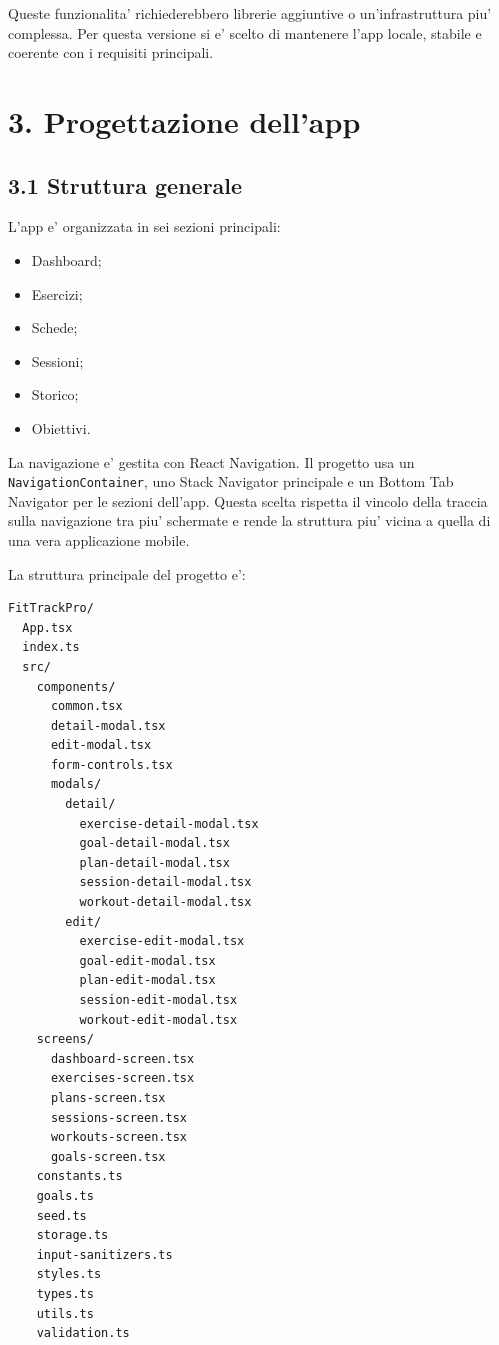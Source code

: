 \documentclass[11pt,a4paper]{article}
\begin{document}
Queste funzionalita' richiederebbero librerie aggiuntive o un'infrastruttura piu' complessa. Per questa versione si e' scelto di mantenere l'app locale, stabile e coerente con i requisiti principali.

\section{3. Progettazione dell'app}

\subsection{3.1 Struttura generale}

L'app e' organizzata in sei sezioni principali:

\begin{itemize}
  \item Dashboard;
  \item Esercizi;
  \item Schede;
  \item Sessioni;
  \item Storico;
  \item Obiettivi.
\end{itemize}

La navigazione e' gestita con React Navigation. Il progetto usa un \texttt{NavigationContainer}, uno Stack Navigator principale e un Bottom Tab Navigator per le sezioni dell'app. Questa scelta rispetta il vincolo della traccia sulla navigazione tra piu' schermate e rende la struttura piu' vicina a quella di una vera applicazione mobile.

La struttura principale del progetto e':

\begin{lstlisting}
FitTrackPro/
  App.tsx
  index.ts
  src/
    components/
      common.tsx
      detail-modal.tsx
      edit-modal.tsx
      form-controls.tsx
      modals/
        detail/
          exercise-detail-modal.tsx
          goal-detail-modal.tsx
          plan-detail-modal.tsx
          session-detail-modal.tsx
          workout-detail-modal.tsx
        edit/
          exercise-edit-modal.tsx
          goal-edit-modal.tsx
          plan-edit-modal.tsx
          session-edit-modal.tsx
          workout-edit-modal.tsx
    screens/
      dashboard-screen.tsx
      exercises-screen.tsx
      plans-screen.tsx
      sessions-screen.tsx
      workouts-screen.tsx
      goals-screen.tsx
    constants.ts
    goals.ts
    seed.ts
    storage.ts
    input-sanitizers.ts
    styles.ts
    types.ts
    utils.ts
    validation.ts
\end{lstlisting}
\end{document}
